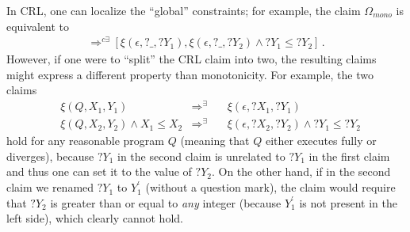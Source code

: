 In CRL, one can localize the ``global'' constraints; for example, the claim $\Omega_{\textit{mono}}$
is equivalent to
\begin{align*}
[\xi(P, X_1, Y_1),\xi(P, X_2, Y_2) \land X_1 \leq X_2] 
\Rightarrow^{c\exists}
[\xi(\epsilon, ?\_, ?Y_1), \xi(\epsilon, ?\_, ?Y_2) \land ?Y_1 \leq ?Y_2] \, .
\end{align*}
However, if one were to ``split'' the CRL claim into two, the resulting claims might express
a different property than monotonicity.
For example, the two claims
\begin{align}
& \xi(Q, X_1, Y_1) & \Rightarrow^{\exists} \quad & \xi(\epsilon, ?X_1, ?Y_1) \\
& \xi(Q, X_2, Y_2) \land X_1 \leq X_2 & \Rightarrow^{\exists} \quad  & \xi(\epsilon, ?X_2, ?Y_2) \land ?Y_1 \leq ?Y_2
\end{align}
hold for any reasonable program $Q$ (meaning that $Q$ either executes fully or diverges),
because $?Y_1$ in the second claim is unrelated to $?Y_1$ in the first claim and thus one can set it to
the value of $?Y_2$.
On the other hand, if in the second claim we renamed $?Y_1$ to $Y_1^\prime$ (without a question mark),
the claim would require that $?Y_2$ is greater than or equal to \emph{any} integer (because $Y_1^\prime$ is not present in the left side),
which clearly cannot hold.

